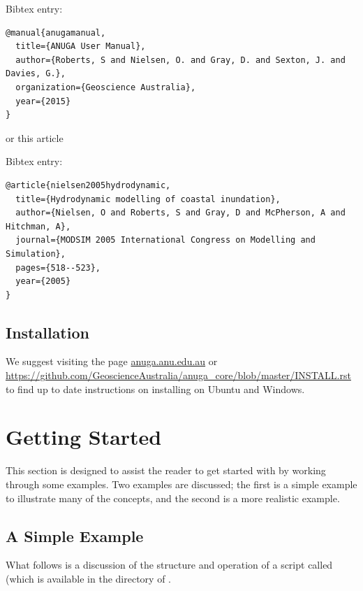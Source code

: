 \documentclass{manual}
\begin{document}
Bibtex entry:
\begin{verbatim}
@manual{anugamanual,
  title={ANUGA User Manual},
  author={Roberts, S and Nielsen, O. and Gray, D. and Sexton, J. and Davies, G.},
  organization={Geoscience Australia},
  year={2015}
}
\end{verbatim}

or this article

Bibtex entry:
\begin{verbatim}
@article{nielsen2005hydrodynamic,
  title={Hydrodynamic modelling of coastal inundation},
  author={Nielsen, O and Roberts, S and Gray, D and McPherson, A and Hitchman, A},
  journal={MODSIM 2005 International Congress on Modelling and Simulation},
  pages={518--523},
  year={2005}
}
\end{verbatim}



\section{Installation}

We suggest visiting the page \url{anuga.anu.edu.au} or \url{https://github.com/GeoscienceAustralia/anuga_core/blob/master/INSTALL.rst} to find up to date  instructions on installing \anuga{} 
on Ubuntu and Windows. 






\chapter{Getting Started}
\label{ch:getstarted}

This section is designed to assist the reader to get started with
\anuga by working through some examples. Two examples are discussed;
the first is a simple example to illustrate many of the concepts, and
the second is a more realistic example.


\section{A Simple Example}
\label{sec:simpleexample}

What follows is a discussion of the structure and operation of a
script called  (which is available in the  
directory of .
\end{document}
